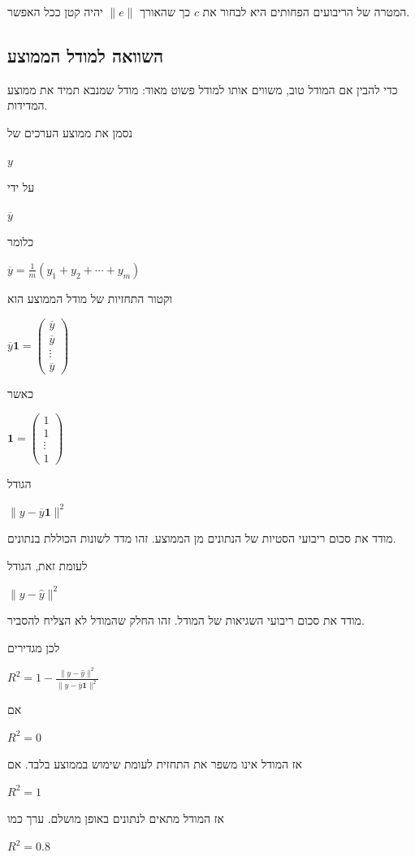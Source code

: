 \documentclass[12pt]{report}
\theoremstyle{plain}
\theoremstyle{definition}
\newcommand{\0}{\mathbf{0}}
\begin{document}
המטרה של הריבועים הפחותים היא לבחור את
$c$
כך שהאורך
$\|e\|$
יהיה קטן ככל האפשר.

\subsection*{השוואה למודל הממוצע}

כדי להבין אם המודל טוב, משווים אותו למודל פשוט מאוד:
מודל שמנבא תמיד את ממוצע המדידות.

נסמן את ממוצע הערכים של

$
y
$

על ידי

$
\overline{y}
$

כלומר

$
\overline{y}=\frac{1}{m}(y_1+y_2+\cdots+y_m)
$

וקטור התחזיות של מודל הממוצע הוא

$
\overline{y}\mathbf{1}
=
\begin{pmatrix}
\overline{y}\\
\overline{y}\\
\vdots\\
\overline{y}
\end{pmatrix}
$

כאשר

$
\mathbf{1}
=
\begin{pmatrix}
1\\
1\\
\vdots\\
1
\end{pmatrix}
$

הגודל

$
\|y-\overline{y}\mathbf{1}\|^2
$

מודד את סכום ריבועי הסטיות של הנתונים מן הממוצע.
זהו מדד לשונות הכוללת בנתונים.

לעומת זאת, הגודל

$
\|y-\hat{y}\|^2
$

מודד את סכום ריבועי השגיאות של המודל.
זהו החלק שהמודל לא הצליח להסביר.

לכן מגדירים

$
R^2
=
1-
\frac{\|y-\hat{y}\|^2}
{\|y-\overline{y}\mathbf{1}\|^2}
$

אם

$
R^2=0
$

אז המודל אינו משפר את התחזית לעומת שימוש בממוצע בלבד.
אם

$
R^2=1
$

אז המודל מתאים לנתונים באופן מושלם.
ערך כמו

$
R^2=0.8
$
\end{document}
